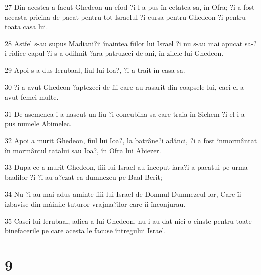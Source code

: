 \par 27 Din acestea a facut Ghedeon un efod ?i l-a pus în cetatea sa, în Ofra; ?i a fost aceasta pricina de pacat pentru tot Israelul ?i cursa pentru Ghedeon ?i pentru toata casa lui.
\par 28 Astfel s-au supus Madiani?ii înaintea fiilor lui Israel ?i nu s-au mai apucat sa-?i ridice capul ?i s-a odihnit ?ara patruzeci de ani, în zilele lui Ghedeon.
\par 29 Apoi s-a dus Ierubaal, fiul lui Ioa?, ?i a trait în casa sa.
\par 30 ?i a avut Ghedeon ?aptezeci de fii care au rasarit din coapsele lui, caci el a avut femei multe.
\par 31 De asemenea i-a nascut un fiu ?i concubina sa care traia în Sichem ?i el i-a pus numele Abimelec.
\par 32 Apoi a murit Ghedeon, fiul lui Ioa?, la batrâne?i adânci, ?i a fost înmormântat în mormântul tatalui sau Ioa?, în Ofra lui Abiezer.
\par 33 Dupa ce a murit Ghedeon, fiii lui Israel au început iara?i a pacatui pe urma baalilor ?i ?i-au a?ezat ca dumnezeu pe Baal-Berit;
\par 34 Nu ?i-au mai adus aminte fiii lui Israel de Domnul Dumnezeul lor, Care îi izbavise din mâinile tuturor vrajma?ilor care îi înconjurau.
\par 35 Casei lui Ierubaal, adica a lui Ghedeon, nu i-au dat nici o cinste pentru toate binefacerile pe care acesta le facuse întregului Israel.

\chapter{9}

